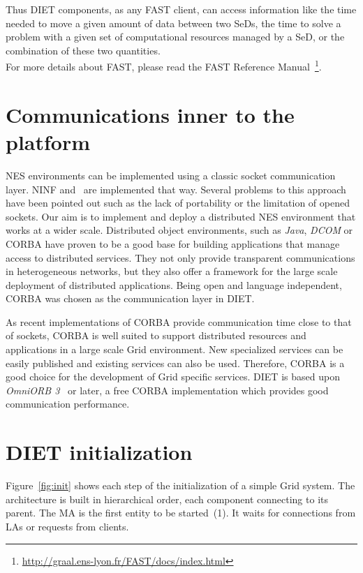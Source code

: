 Thus DIET components, as any FAST client, can access information like the time
needed to move a given amount of data between two SeDs, the time to solve a
problem with a given set of computational resources managed by a SeD, or the
combination of these two quantities.\\

For more details about FAST, please read the FAST Reference Manual~\footnote{\url{http://graal.ens-lyon.fr/FAST/docs/index.html}}.


\section{Communications inner to the platform}
\label{sec:CORBA}

NES environments can be implemented using a classic socket communication layer.
NINF and \nsl\ are implemented that way. Several problems to this approach
have been pointed out such as the lack of portability or the limitation of
opened sockets. Our aim is to implement and deploy a distributed NES
environment that works at a wider scale. Distributed object environments, such
as \emph{Java}, \emph{DCOM} or CORBA have proven to be a good base for
building applications that manage access to distributed services. They not only
provide transparent communications in heterogeneous networks, but they also
offer a framework for the large scale deployment of distributed
applications. Being open and language independent, CORBA was chosen as the
communication layer in DIET.

As recent implementations of CORBA provide communication time close to
that of sockets, CORBA is well suited to support distributed resources
and applications in a large scale Grid environment. New specialized
services can be easily published and existing services can also be
used.  Therefore, CORBA is a good choice for the
development of Grid specific services. DIET is based upon
\emph{OmniORB 3}~\cite{OMNIORB} or later, a free CORBA implementation
which provides good communication performance.


\section{DIET initialization}
\label{init}

Figure~\ref{fig:init} shows each step of the initialization of a simple Grid
system. The architecture is built in hierarchical order, each component
connecting to its parent. The MA is the first entity to be started~(1). It waits
for connections from LAs or requests from clients.

